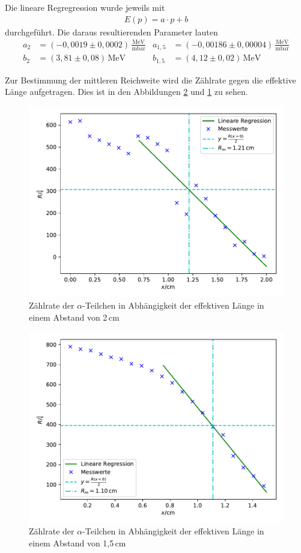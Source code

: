 Die lineare Regregression wurde  jeweils mit
\begin{align*}
  E(p)= a\cdot p +b
\end{align*}
durchgeführt.
Die daraus resultierenden Parameter lauten
\begin{align*}
  a_{2}  &= (-0,0019\pm 0,0002)\, \mathrm{\frac{MeV}{mbar}} & a_{1,5} &=(-0,00186\pm 0,00004)\, \mathrm{\frac{MeV}{mbar}} \\
  b_2 &= (3,81\pm0,08)\,\mathrm{MeV} & b_{1,5} &=(4,12\pm0,02)\, \mathrm{MeV}
\end{align*}

Zur Bestimmung der mittleren Reichweite wird die Zählrate gegen die effektive Länge aufgetragen.
Dies ist in den Abbildungen \ref{fig:mreich1} und \ref{fig:mreich2} zu sehen.

\begin{figure}[H]
\centering
\includegraphics[width=\textwidth]{mreich2.pdf}
\caption{Zählrate der $\alpha$-Teilchen in Abhängigkeit der effektiven Länge in einem Abstand von 2\,cm}
\label{fig:mreich2}
\end{figure}

\begin{figure}[H]
\centering
\includegraphics[width=\textwidth]{mreich1.pdf}
\caption{Zählrate der $\alpha$-Teilchen in Abhängigkeit der effektiven Länge in einem Abstand von 1,5\,cm}
\label{fig:mreich1}
\end{figure}

